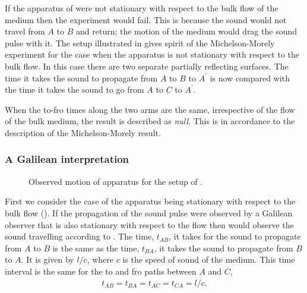 If the apparatus of  were not stationary with respect to the bulk flow of the medium then the experiment would fail.
This is because the sound would not travel from  $A$ to $B$ and return;
the motion of the medium would drag the sound pulse with it.
The setup illustrated in  gives spirit of the Michelson-Morely experiment for the case when the apparatus is not stationary with respect to the bulk flow.
In this case there are two separate partially reflecting surfaces.
The time it takes the sound to propagate from $A$ to $B$ to $A^\prime$ is now compared with the time it takes the sound 
to go from $A$ to $C$ to $A^\prime$.

When the to-fro times along the two arms are the same, irrespective of the flow  of the bulk medium,  the result is described as {\em null}.
This is in accordance to the description of the Michelson-Morely result.

\subsubsection{A Galilean interpretation}\label{sec:MMGalilean}

 \begin{figure}[t]
      \centering
\hspace{2cm}
\label{fig:GalileanA}
      \caption{Observed motion of apparatus for the setup of .}
 \end{figure}

First we consider the case of the apparatus being stationary with respect to the bulk flow ().
If the propagation of the sound pulse were observed by a Galilean observer that is also stationary with respect to the flow
then \she would observe the sound travelling according to .
The time, $t_{AB}$,  it takes for the sound to propagate from $A$ to $B$ is the same as the time, $t_{BA}$, it takes the sound to propagate from $B$ to $A$.
It is given by $l/c$, where  $c$ is the speed of sound of the medium.
This time interval is the same for the to and fro paths between $A$ and $C$,
\begin{align}
  t_{AB}=t_{BA}=t_{AC}=t_{CA}=l/c\label{eqn:setupA:stationary:Tab}.
\end{align}

